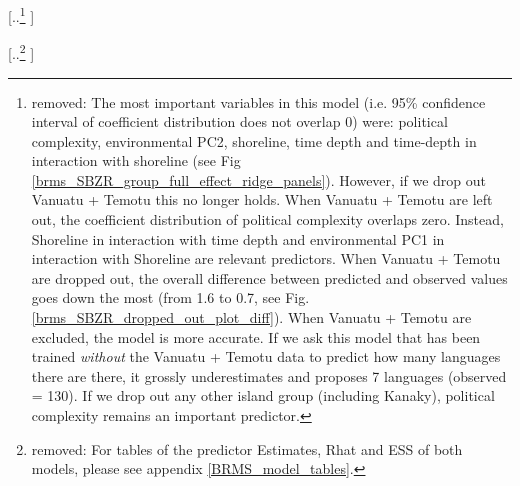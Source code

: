 \documentclass[unnumsec,webpdf,modern,medium]{oup-authoring-template}
\providecommand{\DIFdeltex}[1]{{\protect\color{red} [..\footnote{removed: #1} ]}} %
\providecommand{\DIFdel}[1]{\texorpdfstring{\DIFdeltex{#1}}{}} %
\begin{document}

\DIFdel{The most important variables in this model (i.e. 95\% confidence interval of coefficient distribution does not overlap 0) were: political complexity, environmental PC2, shoreline, time depth and time-depth in interaction with shoreline  (see Fig \ref{brms_SBZR_group_full_effect_ridge_panels}). However, if we drop out Vanuatu + Temotu this no longer holds. When Vanuatu + Temotu are left out, the coefficient distribution of political complexity overlaps zero. Instead,  Shoreline in interaction with time depth and environmental PC1 in interaction with Shoreline are relevant predictors. When Vanuatu + Temotu are dropped out, the overall difference between predicted and observed values goes down the most (from 1.6 to 0.7, see Fig. \ref{brms_SBZR_dropped_out_plot_diff}). When Vanuatu + Temotu are excluded, the model is more accurate. If we ask this model that has been trained \emph{without} the Vanuatu + Temotu data to predict how many languages there are there, it grossly underestimates and proposes 7 languages (observed = 130). If we drop out any other island group (including Kanaky), political complexity remains an important predictor.
}%

\DIFdel{For tables of the predictor Estimates, Rhat and ESS of both models, please see appendix \ref{BRMS_model_tables}.
}%


\end{document}
